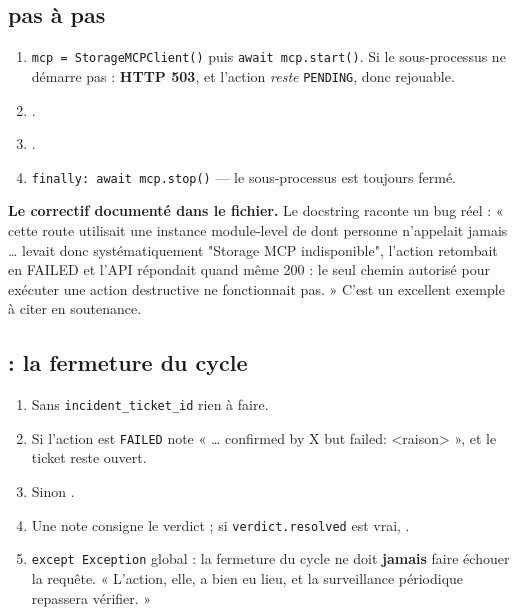 \subsection*{ pas à pas}

\begin{enumerate}
  \item \texttt{mcp = StorageMCPClient()} puis \texttt{await mcp.start()}. Si le
  sous-processus ne démarre pas : \textbf{HTTP 503}, et l'action \emph{reste}
  \texttt{PENDING}, donc rejouable.
  \item {}.
  \item {}.
  \item \texttt{finally: await mcp.stop()} --- le sous-processus est toujours
  fermé.
\end{enumerate}

\begin{keybox}
\textbf{Le correctif documenté dans le fichier.} Le docstring raconte un bug
réel : « cette route utilisait une instance module-level de
 dont personne n'appelait jamais  \ldots{}
 levait donc systématiquement "Storage MCP indisponible",
l'action retombait en FAILED et l'API répondait quand même 200 : le seul chemin
autorisé pour exécuter une action destructive ne fonctionnait pas. »
C'est un excellent exemple à citer en soutenance.
\end{keybox}

\subsection*{ : la fermeture du cycle}

\begin{enumerate}
  \item Sans \texttt{incident\_ticket\_id} \arrowto{} rien à faire.
  \item Si l'action est \texttt{FAILED} \arrowto{} note
  « \ldots{} confirmed by X but failed: <raison> », et le ticket reste ouvert.
  \item Sinon \arrowto{} .
  \item Une note consigne le verdict ; si \texttt{verdict.resolved} est vrai,
  .
  \item \texttt{except Exception} global : la fermeture du cycle ne doit
  \textbf{jamais} faire échouer la requête. « L'action, elle, a bien eu lieu, et
  la surveillance périodique repassera vérifier. »
\end{enumerate}

